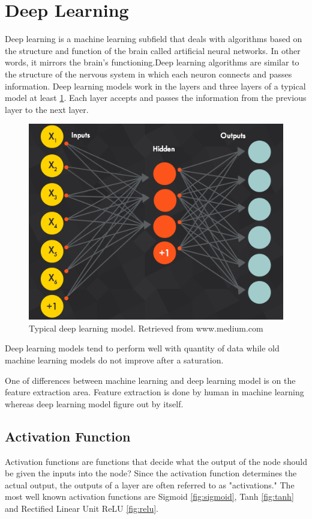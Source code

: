 \documentclass[12pt]{report}
\begin{document}
\newpage
\section{Deep Learning}
Deep learning is a machine learning subfield that deals with algorithms based 
on the structure and function of the brain called artificial neural networks. 
In other words, it mirrors the brain's functioning.Deep learning algorithms 
are similar to the structure of the nervous system in which each neuron connects
and passes information. Deep learning models work in the layers and three layers 
of a typical model at least \ref{fig:deep_learining}. Each layer accepts and passes
the information from the previous layer to the next layer.

\begin{figure} [h]
    \centering
    \includegraphics[width=\textwidth]{./images/deep_learning.png}
    \caption{Typical deep learning model. Retrieved from www.medium.com}
    \label{fig:deep_learining}
\end{figure}

Deep learning models tend to perform well with quantity of data while 
old machine learning models do not improve after a saturation.

One of differences between machine learning and deep learning model 
is on the feature extraction area. Feature extraction is done by human
in machine learning whereas deep learning model figure out by itself.

\subsection{Activation Function}
Activation functions are functions that decide what the output of 
the node should be given the inputs into the node? 
Since the activation function determines the actual output, 
the outputs of a layer are often referred to as "activations."
The most well known activation functions are Sigmoid
\ref{fig:sigmoid}, Tanh \ref{fig:tanh} and
Rectified Linear Unit ReLU \ref{fig:relu}.
\end{document}
